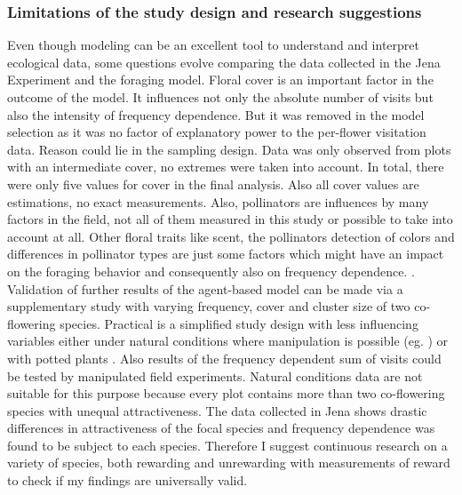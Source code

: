 \subsubsection*{Limitations of the study design and research suggestions}
Even though modeling can be an excellent tool to understand and interpret ecological data, some questions evolve comparing the data collected in the Jena Experiment and the foraging model. Floral cover is an important factor in the outcome of the model. It influences not only the absolute number of visits but also the intensity of frequency dependence. But it was removed in the model selection as it was no factor of explanatory power to the per-flower visitation data. 
Reason could lie in the sampling design. Data was only observed from plots with an intermediate cover, no extremes were taken into account. In total, there were only five values for cover in the final analysis. Also all cover values are estimations, no exact measurements. Also, pollinators are influences by many factors in the field, not all of them measured in this study or possible to take into account at all. Other floral traits like scent, the pollinators detection of colors and differences in pollinator types are just some factors which might have an impact on the foraging behavior and consequently also on frequency dependence. \citep{smithson2001pollinator}. \\

Validation of further results of the agent-based model can be made via a supplementary study with varying frequency, cover and cluster size of two co-flowering species. Practical is a simplified study design with less influencing variables either under natural conditions where manipulation is possible (eg. \citealt{Eckhart2006frequency,essenberg2012explaining}) or with potted plants \citep{epperson1987frequency}. Also results of the frequency dependent sum of visits could be tested by manipulated field experiments. Natural conditions data are not suitable for this purpose because every plot contains more than two co-flowering species with unequal attractiveness.  
The data collected in Jena shows drastic differences in attractiveness of the focal species and frequency dependence was found to be subject to each species. Therefore I suggest continuous research on a variety of species, both rewarding and unrewarding with measurements of reward to check if my findings are universally valid.\\
